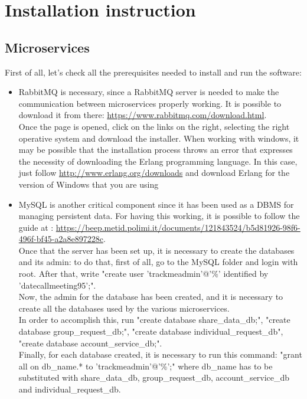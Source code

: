 \section{Installation instruction}
\subsection{Microservices}
First of all, let's check all the prerequisites needed to install and run the software:
\begin{itemize}

\item RabbitMQ is necessary, since a RabbitMQ server is needed to make the communication between microservices properly working.
It is possible to download it from there: \url{https://www.rabbitmq.com/download.html}. \\
Once the page is opened, click on the links on the right, selecting the right operative system and download the installer. 
When working with windows, it may be possible that the installation process throws an error that expresses the necessity of downloading
the Erlang programming language. In this case, just follow \url{http://www.erlang.org/downloads} and download Erlang for the version
of Windows that you are using

\item MySQL is another critical component since it has been used as a DBMS for managing persistent data. For having this working, it
is possible to follow the guide at : \url{https://beep.metid.polimi.it/documents/121843524/b5d81926-98f6-496f-bf45-a2a8e897228c}. \\
Once that the server has been set up, it is necessary to create the databases and its admin: to do that, first of all, go to the MySQL 
folder and login with root. After that, write "create user 'trackmeadmin'@'\%' identified by 'datecallmeeting95';". \\
Now, the admin for the database has been created, and it is necessary to create all the databases used by the various microservices. \\
In order to accomplish this, run "create database share\_data\_db;", "create database group\_request\_db;", 
"create database individual\_request\_db", "create database account\_service\_db;". \\
Finally, for each database created, it is necessary to run this command: "grant all on db\_name.* to 'trackmeadmin'@'\%';"
where db\_name has to be substituted with share\_data\_db, group\_request\_db, account\_service\_db and individual\_request\_db. 

\end{itemize}

